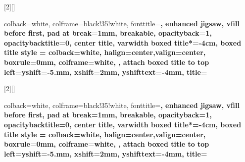  [2][]{
    colback=white,
    colframe=black!35!white,
    fonttitle=\bfseries,
    enhanced jigsaw,
    vfill before first, 
    pad at break=1mm,
    breakable,
    opacityback=1,
    opacitybacktitle=0,
    center title,
    varwidth boxed title*=-4cm,
    boxed title style = {
    colback=white,
    halign=center,valign=center,
    boxrule=0mm,
    colframe=white,
    },
    attach boxed title to top left={yshift=-5.mm, xshift=2mm, yshifttext=-4mm},
    title={      
        }
    }

    [2][]{
      colback=white,
      colframe=black!35!white,
      fonttitle=\bfseries,
      enhanced jigsaw,
      vfill before first, 
      pad at break=1mm,
      breakable,
      opacityback=1,
      opacitybacktitle=0,
      center title,
      varwidth boxed title*=-4cm,
      boxed title style = {
      colback=white,
      halign=center,valign=center,
      boxrule=0mm,
      colframe=white,
      },
      attach boxed title to top left={yshift=-5.mm, xshift=2mm, yshifttext=-4mm},
      title={      
          }
      }

      \newenvironment{anotation}[1]
      {\color{gray}\itemize[
         nosep,
         leftmargin=\dimexpr\textwidth-#1\relax,
         rightmargin=0pt,
         itemindent=\parindent,
         listparindent=\parindent,
       ]\item[]\relax}
      {\enditemize}
      
      \newcommand{\note}[1]{
         \begin{anotation}{5cm}
             #1
         \end{anotation}
      }